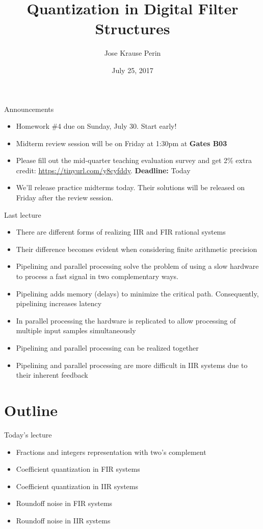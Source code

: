 \documentclass[10pt]{beamer}
\title[EE 264]{Quantization in Digital Filter Structures}
\author{Jose Krause Perin}
\institute{Stanford University}
\date{July 25, 2017}
\begin{document}
\begin{frame}
  \titlepage
\end{frame}

%
\begin{frame}{Announcements}
	\begin{itemize}
		\item Homework \#4 due on Sunday, July 30. Start early!
		\item Midterm review session will be on Friday at 1:30pm at \textbf{Gates B03}
		\item Please fill out the mid-quarter teaching evaluation survey and get 2\% extra credit: \url{https://tinyurl.com/y8cyfddy}. \textbf{Deadline:} Today
		\item We'll release practice midterms today. Their solutions will be released on Friday after the review session.
	\end{itemize}
\end{frame}

%
\begin{frame}{Last lecture}
\begin{itemize}
	\item There are different forms of realizing IIR and FIR rational systems
	\item Their difference becomes evident when considering finite arithmetic precision
	\item Pipelining and parallel processing solve the problem of using a slow hardware to process a fast signal in two complementary ways. 
	\item Pipelining adds memory (delays) to minimize the critical path. Consequently, pipelining increases latency
	\item In parallel processing the hardware is replicated to allow processing of multiple input samples simultaneously
	\item Pipelining and parallel processing can be realized together
	\item Pipelining and parallel processing are more difficult in IIR systems due to their inherent feedback
\end{itemize}
\end{frame}

%
\section{Outline}
\begin{frame}{Today's lecture}	
	\begin{itemize}
		\item Fractions and integers representation with two's complement
		\item Coefficient quantization in FIR systems
		\item Coefficient quantization in IIR systems
		\item Roundoff noise in FIR systems
		\item Roundoff noise in IIR systems
	\end{itemize}
\end{frame}
\end{document}
